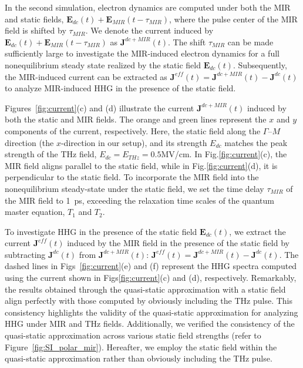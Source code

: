 In the second simulation, electron dynamics are computed under both the MIR and static fields, $\mathbf E_{dc}(t) + \mathbf E_{MIR}(t - \tau_{MIR})$, where the pulse center of the MIR field is shifted by $\tau_{MIR}$. We denote the current induced by $\mathbf E_{dc}(t) + \mathbf E_{MIR}(t - \tau_{MIR})$ as $\mathbf J^{dc+MIR}(t)$. The shift $\tau_{MIR}$ can be made sufficiently large to investigate the MIR-induced electron dynamics for a full nonequilibrium steady state realized by the static field $\mathbf E_{dc}(t)$. Subsequently, the MIR-induced current can be extracted as $\mathbf J^{eff}(t) = \mathbf J^{dc+MIR}(t) - \mathbf J^{dc}(t)$ to analyze MIR-induced HHG in the presence of the static field.

Figures~\ref{fig:current}(c) and (d) illustrate the current $\mathbf J^{dc+MIR}(t)$ induced by both the static and MIR fields. The orange and green lines represent the $x$ and $y$ components of the current, respectively. Here, the static field along the $\Gamma$--$M$ direction (the $x$-direction in our setup), and its strength $E_{dc}$ matches the peak strength of the THz field, $E_{dc}=E_{THz}=0.5$MV/cm. In Fig.\ref{fig:current}(c), the MIR field aligns parallel to the static field, while in Fig.\ref{fig:current}(d), it is perpendicular to the static field. To incorporate the MIR field into the nonequilibrium steady-state under the static field, we set the time delay $\tau_{MIR}$ of the MIR field to 1~ps, exceeding the relaxation time scales of the quantum master equation, $T_1$ and $T_2$.

To investigate HHG in the presence of the static field $\mathbf E_{dc}(t)$, we extract the current
$\mathbf J^{eff}(t)$ induced by the MIR field in the presence of the static field by subtracting
$\mathbf J^{dc}(t)$ from $\mathbf J^{dc+MIR}(t)$: $\mathbf J^{eff}(t)=\mathbf J^{dc+MIR}(t)-\mathbf
	J^{dc}(t)$. The dashed lines in Figs~\ref{fig:current}(e) and (f) represent the HHG spectra
computed using the current shown in Figs\ref{fig:current}(c) and (d), respectively. Remarkably, the
results obtained through the quasi-static approximation with a static field align perfectly with
those computed by obviously including the THz pulse. This consistency highlights the validity of
the quasi-static approximation for analyzing HHG under MIR and THz fields. Additionally, we verified
the consistency of the quasi-static approximation across various static field strengths (refer to
Figure~\ref{fig:SI_polar_mir}). Hereafter, we employ the static field within the quasi-static approximation rather than obviously including the THz pulse.

